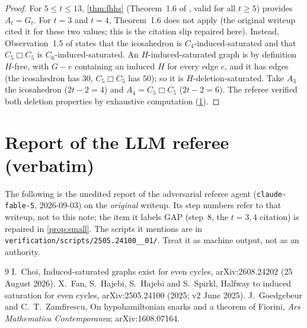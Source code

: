 \documentclass[11pt,a4paper]{article}
\theoremstyle{plain}
\theoremstyle{definition}
\theoremstyle{remark}
\newcommand{\cart}{\mathbin{\mdlgwhtsquare}}
\begin{document}
\propsmall*
\begin{proof}
For $5\le t\le13$, \cref{thm:fhhs} (Theorem~1.6 of \cite{FHHS25}, valid for all $t\ge5$) provides $A_t=G_t$. For $t=3$ and $t=4$, Theorem~1.6 does not apply (the original writeup cited it for these two values; this is the citation slip repaired here). Instead, Observation~1.5 of \cite{FHHS25} states that the icosahedron is $C_4$-induced-saturated and that $C_5\cart C_5$ is $C_6$-induced-saturated. An $H$-induced-saturated graph is by definition $H$-free, with $G-e$ containing an induced $H$ for every edge $e$, and it has edges (the icosahedron has $30$, $C_5\cart C_5$ has $50$); so it is $H$-deletion-saturated. Take $A_3$ the icosahedron ($2t-2=4$) and $A_4=C_5\cart C_5$ ($2t-2=6$). The referee verified both deletion properties by exhaustive computation (\cref{app:referee}).
\end{proof}

\section{Report of the LLM referee (verbatim)}\label{app:referee}

\begin{tcolorbox}[colback=gray!8,colframe=gray!50,boxrule=0.4pt,arc=2pt]
\small The following is the unedited report of the adversarial referee agent (\texttt{claude-fable-5}, 2026-09-03) on the \emph{original} writeup. Its step numbers refer to that writeup, not to this note; the item it labels GAP (step~8, the $t=3,4$ citation) is repaired in \cref{prop:small}. The scripts it mentions are in \texttt{verification/scripts/2505.24100\_\_01/}. Treat it as machine output, not as an authority.
\end{tcolorbox}



\begin{thebibliography}{9}
 I.~Choi, Induced-saturated graphs exist for even cycles, arXiv:2608.24202 (25 August 2026).
 X.~Fan, S.~Hajebi, S.~Hajebi and S.~Spirkl, Halfway to induced saturation for even cycles, arXiv:2505.24100 (2025; v2 June 2025).
 J.~Goedgebeur and C.~T.~Zamfirescu, On hypohamiltonian snarks and a theorem of Fiorini, \emph{Ars Mathematica Contemporanea}; arXiv:1608.07164.
\end{thebibliography}
\end{document}
